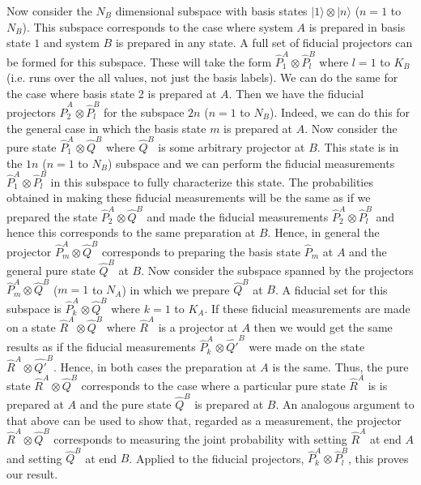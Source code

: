 \documentclass[10pt,twocolumn]{article}
\begin{document}
Now consider the $N_B$ dimensional subspace
with basis states $|1\rangle\otimes|n\rangle$ ($n=1$ to $N_B$). This
subspace corresponds to the case where system $A$ is prepared in basis
state $1$ and system $B$ is prepared in any state.  A full
set of fiducial projectors can be formed for this subspace.  These will
take the form $\hat{P}^A_1\otimes\hat{P}^B_l$ where $l=1$ to $K_B$ (i.e.
runs over the all values, not just the basis labels).  We can do the
same for the case where basis state 2 is prepared at $A$.  Then we have
the fiducial projectors $\hat{P}^A_2\otimes\hat{P}^B_l$ for the subspace
$2n$ ($n=1$ to $N_B$). Indeed, we can do this for the general case in
which the basis state $m$ is prepared at $A$.  Now consider the pure
state $\hat{P}^A_1\otimes\hat{Q}^B$ where $\hat{Q}^B$ is some arbitrary
projector at $B$.  This state is in the $1n$ ($n=1$ to $N_B$) subspace
and we can perform the fiducial measurements
$\hat{P}^A_1\otimes\hat{P}_l^B$ in this subspace to fully characterize
this state.  The probabilities obtained in making these fiducial
measurements will be the same as if we prepared the state
$\hat{P}^A_2\otimes\hat{Q}^B$ and made the fiducial measurements
$\hat{P}^A_2\otimes\hat{P}_l^B$ and hence this corresponds to the same
preparation at $B$.  Hence, in general the projector
$\hat{P}^A_m\otimes\hat{Q}^B$ corresponds to preparing the basis state
$\hat{P}_m$ at $A$ and the general pure state $\hat{Q}^B$ at $B$.
Now consider the subspace spanned by
the projectors $\hat{P}^A_m\otimes\hat{Q}^B$ ($m=1$ to $N_A$) in which
we prepare $\hat{Q}^B$ at $B$.  A fiducial set for this subspace is
$\hat{P}^A_k\otimes\hat{Q}^B$ where $k=1$ to $K_A$.  If these fiducial
measurements are made on a state $\hat{R}^A\otimes\hat{Q}^B$ where
$\hat{R}^A$ is a projector at $A$ then we would get the same results as
if the fiducial measurements $\hat{P}^A_k\otimes\hat{Q'}^B$ were made on
the state $\hat{R}^A\otimes\hat{Q'}^B$.  Hence, in both cases the
preparation at $A$ is the same.  Thus, the pure state
$\hat{R}^A\otimes\hat{Q}^B$ corresponds to the case where a particular
pure state $\hat{R}^A$ is is prepared at $A$ and the pure state
$\hat{Q}^B$ is prepared at $B$.  An analogous argument to that above can
be used to show that, regarded as a measurement, the
projector $\hat{R}^A\otimes\hat{Q}^B$ corresponds to
measuring the joint probability with setting $\hat{R}^A$ at end $A$ and
setting $\hat{Q}^B$ at end $B$.   Applied to the fiducial projectors,
$\hat{P}_k^A\otimes\hat{P}_l^B$, this proves our result.
\end{document}
